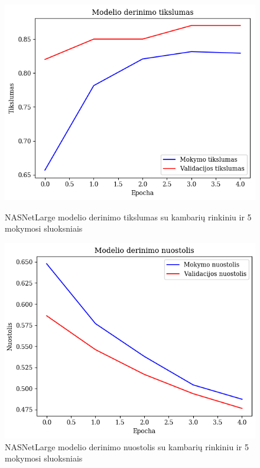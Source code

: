 \documentclass{VUMIFPSbakalaurinis}
\begin{document}
\begin{figure}[!htbp]
    \centering
    \begin{minipage}[b]{0.48\textwidth}
      \includegraphics[width=\textwidth]{img/GrapthsNEW/Large/room/5/Acc_R_L_5.png}
      \caption{NASNetLarge modelio derinimo tikslumas su kambarių rinkiniu ir 5 mokymosi sluoksniais}
    \end{minipage}
    \hspace{2mm}
    \begin{minipage}[b]{0.48\textwidth}
      \includegraphics[width=\textwidth]{img/GrapthsNEW/Large/room/5/Loss_R_L_5.png}
      \caption{NASNetLarge modelio derinimo nuostolis su kambarių rinkiniu ir 5 mokymosi sluoksniais}
    \end{minipage}
\end{figure}
\end{document}
